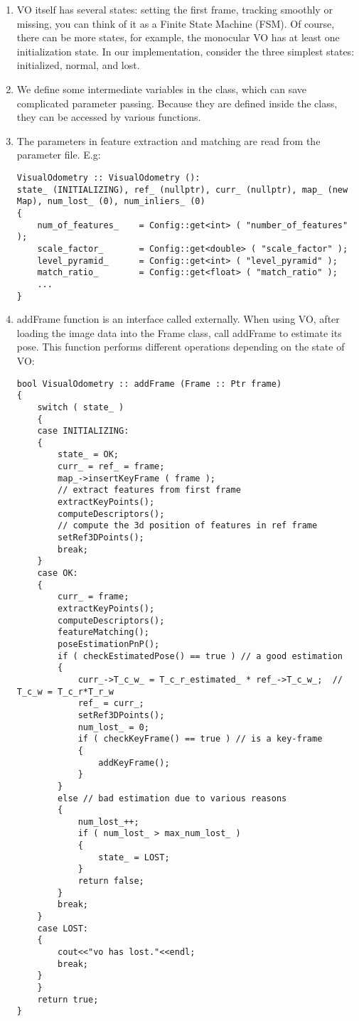 \begin{enumerate}
\item VO itself has several states: setting the first frame, tracking smoothly or missing, you can think of it as a Finite State Machine (FSM). Of course, there can be more states, for example, the monocular VO has at least one initialization state. In our implementation, consider the three simplest states: initialized, normal, and lost.
\item We define some intermediate variables in the class, which can save complicated parameter passing. Because they are defined inside the class, they can be accessed by various functions.
\item The parameters in feature extraction and matching are read from the parameter file. E.g:
\begin{lstlisting}[language = c ++]
VisualOdometry :: VisualOdometry ():
state_ (INITIALIZING), ref_ (nullptr), curr_ (nullptr), map_ (new Map), num_lost_ (0), num_inliers_ (0)
{
	num_of_features_    = Config::get<int> ( "number_of_features" );
	scale_factor_       = Config::get<double> ( "scale_factor" );
	level_pyramid_      = Config::get<int> ( "level_pyramid" );
	match_ratio_        = Config::get<float> ( "match_ratio" );
	...
}
\end{lstlisting}
\item addFrame function is an interface called externally. When using VO, after loading the image data into the Frame class, call addFrame to estimate its pose. This function performs different operations depending on the state of VO:
\begin{lstlisting}[language = c ++]
bool VisualOdometry :: addFrame (Frame :: Ptr frame)
{
	switch ( state_ )
	{
	case INITIALIZING:
	{
		state_ = OK;
		curr_ = ref_ = frame;
		map_->insertKeyFrame ( frame );
		// extract features from first frame 
		extractKeyPoints();
		computeDescriptors();
		// compute the 3d position of features in ref frame 
		setRef3DPoints();
		break;
	}
	case OK:
	{
		curr_ = frame;
		extractKeyPoints();
		computeDescriptors();
		featureMatching();
		poseEstimationPnP();
		if ( checkEstimatedPose() == true ) // a good estimation
		{
			curr_->T_c_w_ = T_c_r_estimated_ * ref_->T_c_w_;  // T_c_w = T_c_r*T_r_w 
			ref_ = curr_;
			setRef3DPoints();
			num_lost_ = 0;
			if ( checkKeyFrame() == true ) // is a key-frame
			{
				addKeyFrame();
			}
		}
		else // bad estimation due to various reasons
		{
			num_lost_++;
			if ( num_lost_ > max_num_lost_ )
			{
				state_ = LOST;
			}
			return false;
		}
		break;
	}
	case LOST:
	{
		cout<<"vo has lost."<<endl;
		break;
	}
	}
	return true;
}
\end{lstlisting}
\end{enumerate}


